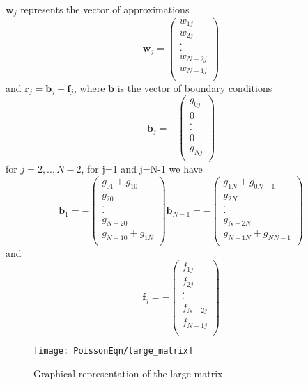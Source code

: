 $\mathbf{w}_j$ represents the vector of approximations
\[\mathbf{w}_j=\left(\begin{array}{c}
w_{1j}\\
w_{2j}\\
.\\
.\\
w_{N-2j}\\
w_{N-1j}\\
\end{array}\right)
\]
and $\mathbf{r}_j=\mathbf{b}_j-\mathbf{f}_j$, where $\mathbf{b}$ is the vector of 
boundary conditions 
\[\mathbf{b}_j =-\left(\begin{array}{c}
g_{0j}\\
0\\
.\\
.\\
0\\
g_{Nj}\\
\end{array}\right)
\]
for $j=2,..,N-2$, for j=1 and j=N-1 we have
\[
\mathbf{b}_1 =-\left(\begin{array}{c}
g_{01}+g_{10}\\
g_{20}\\
.\\
.\\
g_{N-20}\\
g_{N-10}+g_{1N}\\
\end{array}\right)
\mathbf{b}_{N-1} =-\left(\begin{array}{c}
g_{1N}+g_{0N-1}\\
g_{2N}\\
.\\
.\\
g_{N-2N}\\
g_{N-1N}+g_{NN-1}\\
\end{array}\right)
\]
and 
\[\mathbf{f}_j =-\left(\begin{array}{c}
f_{1j}\\
f_{2j}\\
.\\
.\\
f_{N-2j}\\
f_{N-1j}\\
\end{array}\right)
\]

\begin{figure}[H]
  \caption{Graphical representation of the large matrix}
  \centering
    \texttt{[image: PoissonEqn/large\_matrix]}
\end{figure}

